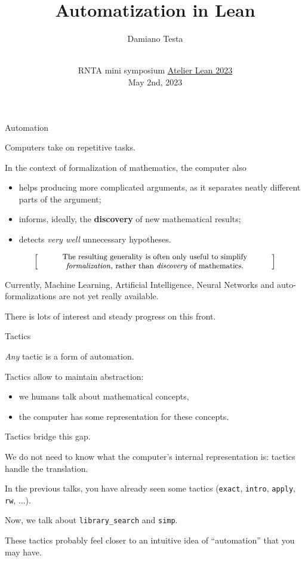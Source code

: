 \documentclass{beamer}
\title{Automatization in Lean}
\author{Damiano Testa}
\institute[]{University of Warwick}
\date[\href{http://www.rnta.eu/7MSRNTA/lean.html}{Atelier Lean 2023}]{\\
\vspace{50pt}
RNTA mini symposium
\href{http://www.rnta.eu/7MSRNTA/lean.html}{Atelier Lean 2023}\\
\vspace{20pt}
May 2nd, 2023
}
\begin{document}
\frame{\titlepage}

\begin{frame}[fragile]
{Automation}

Computers take on repetitive tasks.

In the context of formalization of mathematics, the computer also

\vspace{-13pt}
\begin{itemize}
\setlength\itemsep{-12pt}
\item
  helps producing more complicated arguments, as it separates neatly different parts of the argument;
\item
  informs, ideally, the {\textbf{discovery}} of new mathematical results;
\item
  detects {\emph{very well}} unnecessary hypotheses.
\end{itemize}

\[
  \left[ \;
  \parbox{0.8\textwidth}{\centering\small
  The resulting generality is often only useful to simplify {\emph{formalization}}, rather than {\emph{discovery}} of mathematics.
  }
  \; \right]
\]

Currently, Machine Learning, Artificial Intelligence, Neural Networks and auto-formalizations are not yet really available.

There is lots of interest and steady progress on this front.
\end{frame}

\begin{frame}[fragile]{Tactics}

{\emph{Any}} tactic is a form of automation.

Tactics allow to maintain abstraction:

\vspace{-13pt}
\begin{itemize}
\setlength\itemsep{-12pt}
\item
  we humans talk about mathematical concepts,
\item
  the computer has some representation for these concepts.
\end{itemize}

Tactics bridge this gap.

We do not need to know what the computer's internal representation is: tactics handle the translation.
\end{frame}

\begin{frame}[fragile]

In the previous talks, you have already seen some tactics ({\color{violet}\verb`exact`}, {\color{violet}\verb`intro`}, {\color{violet}\verb`apply`}, {\color{violet}\verb`rw`}, ...).

Now, we talk about {\color{violet}\verb`library_search`} and {\color{violet}\verb`simp`}.

These tactics probably feel closer to an intuitive idea of ``automation'' that you may have.
\end{frame}
\end{document}
